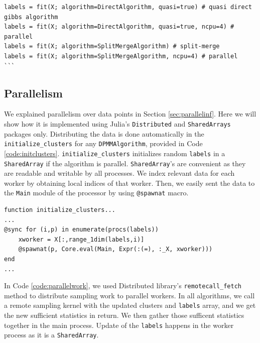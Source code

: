 \documentclass[12pt, a4paper]{article}
\newenvironment{code}{\captionsetup{type=listing}}{}
\begin{document}
\begin{code}
\begin{verbatim}
labels = fit(X; algorithm=DirectAlgorithm, quasi=true) # quasi direct gibbs algorithm
labels = fit(X; algorithm=DirectAlgorithm, quasi=true, ncpu=4) # parallel 
labels = fit(X; algorithm=SplitMergeAlgorithm) # split-merge
labels = fit(X; algorithm=SplitMergeAlgorithm, ncpu=4) # parallel
```
\end{verbatim}
\label{code:fit}
\end{code}


\subsection{Parallelism}

We explained parallelism over data points in Section \ref{sec:parallelinf}. Here we will show how it is implemented using Julia's \texttt{Distributed} and \texttt{SharedArrays} packages only. Distributing the data is done automatically in the \texttt{initialize\_clusters} for any \texttt{DPMMAlgorithm}, provided in Code \ref{code:initclusters}. \texttt{initialize\_clusters} initializes random \texttt{labels} in a \texttt{SharedArray} if the algorithm is parallel. \texttt{SharedArray}'s are convenient as they are readable and writable by all processes. We index relevant data for each worker by obtaining local indices of that worker. Then, we easily sent the data to the \texttt{Main} module of the processor by using \texttt{@spawnat} macro.

\begin{code}
\begin{verbatim}
function initialize_clusters...
...
@sync for (i,p) in enumerate(procs(labels))
    xworker = X[:,range_1dim(labels,i)]
    @spawnat(p, Core.eval(Main, Expr(:(=), :_X, xworker)))
end
...
\end{verbatim}
\label{code:initclusters}
\end{code}

In Code \ref{code:parallelwork}, we used Distributed library's \texttt{remotecall\_fetch} method to distribute sampling work to parallel workers. In all algorithms, we call a remote sampling kernel with the updated clusters and \texttt{labels} array, and we get the new sufficient statistics in return. We then gather those sufficent statistics together in the main process. Update of the \texttt{labels} happens in the worker process as it is a \texttt{SharedArray}.
\end{document}
